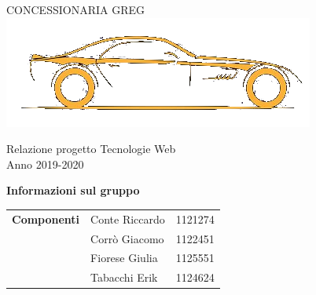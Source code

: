 \begin{center}
	\huge{CONCESSIONARIA GREG}\\
	\vspace{15pt}
	\includegraphics{./img/logoGreg-trasparente.png}
\end{center}

\vspace{1.5cm}

\begin{center}
	\huge{Relazione progetto Tecnologie Web}\\[0.2cm]
	\Large{Anno 2019-2020}
\end{center}

\vspace{5pt}

\begin{center}
	\textbf{\Large{Informazioni sul gruppo}}
\begin{table}[H]
	\hspace{3.5cm}
	\renewcommand{\arraystretch}{1.4}
	\begin{tabular}{l | l  l}
		\textbf{Componenti} & Conte Riccardo & 1121274\\
		& Corrò Giacomo & 1122451\\
		& Fiorese Giulia & 1125551\\
		& Tabacchi Erik & 1124624\\
	\end{tabular}
\end{table}
\end{center}

\hspace{5pt}

